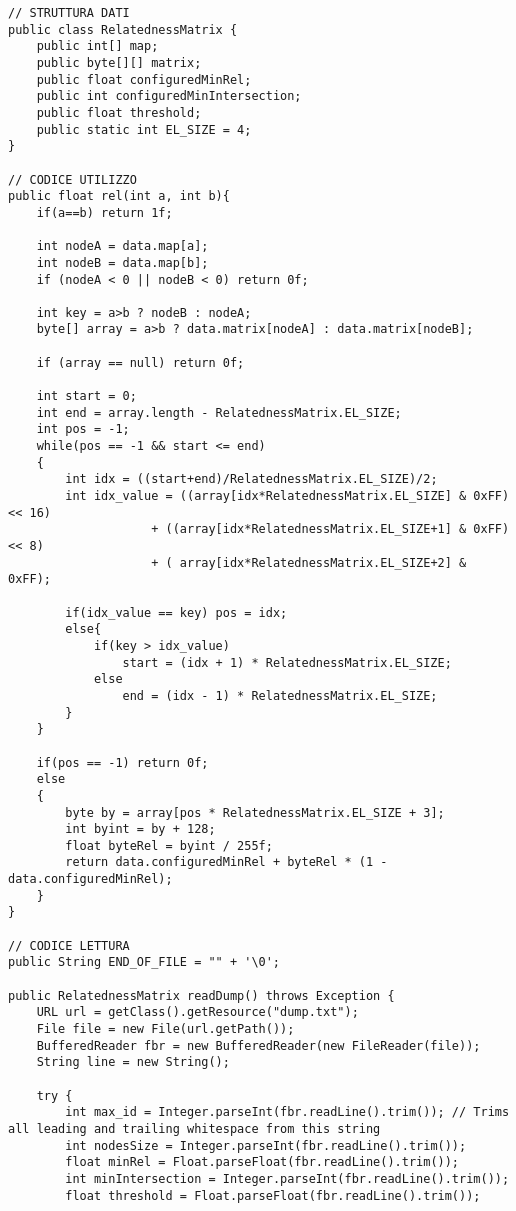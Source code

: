 \begin{lstlisting}[style=JavaStyle]
// STRUTTURA DATI
public class RelatednessMatrix {
    public int[] map;
    public byte[][] matrix;
    public float configuredMinRel;
    public int configuredMinIntersection;
    public float threshold;
    public static int EL_SIZE = 4;
}

// CODICE UTILIZZO
public float rel(int a, int b){
    if(a==b) return 1f;

    int nodeA = data.map[a];
    int nodeB = data.map[b];
    if (nodeA < 0 || nodeB < 0) return 0f;

    int key = a>b ? nodeB : nodeA;
    byte[] array = a>b ? data.matrix[nodeA] : data.matrix[nodeB];

    if (array == null) return 0f;

    int start = 0;
    int end = array.length - RelatednessMatrix.EL_SIZE;
    int pos = -1;
    while(pos == -1 && start <= end)
    {
        int idx = ((start+end)/RelatednessMatrix.EL_SIZE)/2;
        int idx_value = ((array[idx*RelatednessMatrix.EL_SIZE] & 0xFF) << 16)
                    + ((array[idx*RelatednessMatrix.EL_SIZE+1] & 0xFF) << 8)
                    + ( array[idx*RelatednessMatrix.EL_SIZE+2] & 0xFF);

        if(idx_value == key) pos = idx;
        else{
            if(key > idx_value)
                start = (idx + 1) * RelatednessMatrix.EL_SIZE;
            else
                end = (idx - 1) * RelatednessMatrix.EL_SIZE;
        }
    }

    if(pos == -1) return 0f;
    else
    {
        byte by = array[pos * RelatednessMatrix.EL_SIZE + 3];
        int byint = by + 128;
        float byteRel = byint / 255f;
        return data.configuredMinRel + byteRel * (1 - data.configuredMinRel);
    }
}

// CODICE LETTURA
public String END_OF_FILE = "" + '\0';

public RelatednessMatrix readDump() throws Exception {
    URL url = getClass().getResource("dump.txt");
    File file = new File(url.getPath());
    BufferedReader fbr = new BufferedReader(new FileReader(file));
    String line = new String();

    try {   
        int max_id = Integer.parseInt(fbr.readLine().trim()); // Trims all leading and trailing whitespace from this string         
        int nodesSize = Integer.parseInt(fbr.readLine().trim());
        float minRel = Float.parseFloat(fbr.readLine().trim());
        int minIntersection = Integer.parseInt(fbr.readLine().trim());
        float threshold = Float.parseFloat(fbr.readLine().trim());         


\end{lstlisting}
